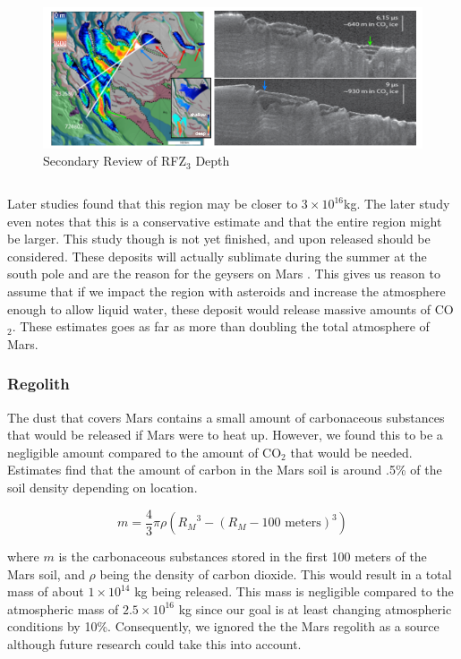 \documentclass[a4paper]{article}
\begin{document}
     \begin{figure}[h]
		\centering
		\includegraphics[scale=.5]{Cool2.PNG}
		\caption{Secondary Review of RFZ$_3$ Depth \cite{n._e._putzig_low_2015}}
	\end{figure} \[\]
    
    Later studies found that this region may be closer to $3 \times 10^{16}$kg. The later study even notes that this is a conservative estimate and that the entire region might be larger. This study though is not yet finished, and upon released should be considered\cite{n._e._putzig_low_2015}. These deposits will actually sublimate during the summer at the south pole and are the reason for the geysers on Mars \cite{wikipedia_climate_2015} \cite{roger_j._phillips_massive_2011}. This gives us reason to assume that if we impact the region with asteroids and increase the atmosphere enough to allow liquid water, these deposit would release massive amounts of CO$_2$. These estimates goes as far as more than doubling the total atmosphere of Mars\cite{n._e._putzig_low_2015}.
    
     \subsubsection{Regolith}

  The dust that covers Mars contains a small amount of carbonaceous substances that would be released if Mars were to heat up. However, we found this to be a negligible amount compared to the amount of CO$_2$ that would be needed. Estimates find that the amount of carbon in the Mars soil is around .5\% of the soil density depending on location. \cite{carlton_c._allen_martian_????}
  
  \[m = \dfrac{4}{3} \pi \rho \left({R_M}^3 - \left(R_M - 100 \text{ meters} \right)^3 \right)\]

where $m$ is the carbonaceous substances stored in the first 100 meters of the Mars soil, and $\rho$ being the density of carbon dioxide. This would result in a total mass of about $1 \times 10^{14}$ kg being released.
This mass is negligible compared to the atmospheric mass of $2.5 \times 10^{16}$ kg since our goal is at least changing atmospheric conditions by 10\%. Consequently, we ignored the the Mars regolith as a source although future research could take this into account.
\end{document}
